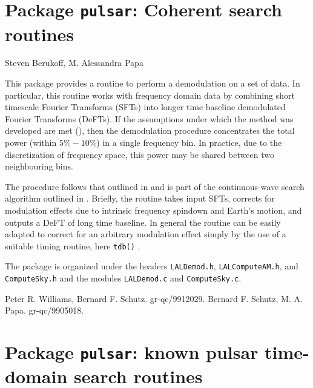 \chapter{Package \texttt{pulsar}: Coherent search routines}
Steven Berukoff, M. Alessandra Papa
\bigskip

This package provides a routine to perform a demodulation on a set of data.
In particular, this routine works with frequency domain data by combining
short timescale Fourier Transforms (SFTs) into longer time baseline
demodulated Fourier Transforms (DeFTs). If the assumptions under which the
method was developed are met (\cite{Williams:1999}), then the demodulation
procedure concentrates the total power (within $5\%-10\%$) in a single
frequency bin. In practice, due to the discretization of frequency space, this
power may be shared between two neighbouring bins.

The procedure follows that outlined in \cite{Williams:1999} and is part of the
continuous-wave search algorithm outlined in \cite{Schutz:1999}.  Briefly, the
routine takes input SFTs, corrects for modulation effects due to intrinsic
frequency spindown and Earth's motion, and outputs a DeFT of long time
baseline. In general the routine can be easily adapted to correct for an
arbitrary modulation effect simply by the use of a suitable timing routine,
here \verb+tdb()+ .

The package is organized under the headers \verb+LALDemod.h+, \verb+LALComputeAM.h+, and
\verb+ComputeSky.h+ and the modules \verb+LALDemod.c+ and \verb+ComputeSky.c+.


\newpage
\newpage
\newpage
\newpage

\newpage\begin{thebibliography}{0}
        Peter R. Williams, Bernard F. Schutz.  gr-qc/9912029.
        Bernard F. Schutz, M. A. Papa.  gr-qc/9905018.
\end{thebibliography}

\chapter{Package \texttt{pulsar}: known pulsar time-domain search routines}

